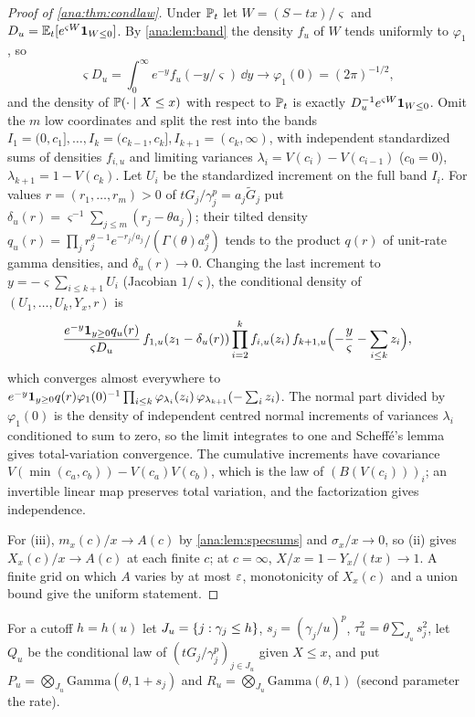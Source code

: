 \begin{proof}[Proof of \cref{ana:thm:condlaw}]
Under $\mathbb{P}_t$ let $W=(S-tx)/\varsigma$ and $D_u=\mathbb{E}_t[e^{\varsigma W}\mathbf{1}_{W\le0}]$. By
\cref{ana:lem:band} the density $f_u$ of $W$ tends uniformly to $\varphi_1$, so
\begin{equation}\label{ana:eq:Du}
 \varsigma D_u=\int_0^\infty e^{-y}f_u(-y/\varsigma)\,\dd y\to\varphi_1(0)=(2\pi)^{-1/2},
\end{equation}
and the density of $\mathbb{P}(\cdot\mid X\le x)$ with respect to $\mathbb{P}_t$ is exactly
$D_u^{-1}e^{\varsigma W}\mathbf{1}_{W\le0}$. Omit the $m$ low coordinates and split the rest into the bands
$I_1=(0,c_1],\dots,I_k=(c_{k-1},c_k],I_{k+1}=(c_k,\infty)$, with independent standardized sums of
densities $f_{i,u}$ and limiting variances $\lambda_i=V(c_i)-V(c_{i-1})$ ($c_0=0$), $\lambda_{k+1}=1-V(c_k)$.
Let $U_i$ be the standardized increment on the full band $I_i$. For values $r=(r_1,\dots,r_m)>0$ of
$tG_j/\gamma_j^p=a_j\widetilde G_j$ put $\delta_u(r)=\varsigma^{-1}\sum_{j\le m}(r_j-\theta a_j)$; their
tilted density $q_u(r)=\prod_j r_j^{\theta-1}e^{-r_j/a_j}/(\Gamma(\theta)a_j^\theta)$ tends to the
product $q(r)$ of unit-rate gamma densities, and $\delta_u(r)\to0$. Changing the last increment to
$y=-\varsigma\sum_{i\le k+1}U_i$ (Jacobian $1/\varsigma$), the conditional density of
$(U_1,\dots,U_k,Y_x,r)$ is
\[
 \frac{e^{-y}\mathbf{1}_{y\ge0}q_u(r)}{\varsigma D_u}\,f_{1,u}(z_1-\delta_u(r))\prod_{i=2}^kf_{i,u}(z_i)\,
 f_{k+1,u}\Bigl(-\frac y\varsigma-\sum_{i\le k}z_i\Bigr),
\]
which converges almost everywhere to
$e^{-y}\mathbf{1}_{y\ge0}q(r)\varphi_1(0)^{-1}\prod_{i\le k}\varphi_{\lambda_i}(z_i)\,
\varphi_{\lambda_{k+1}}(-\sum_iz_i)$. The normal part divided by $\varphi_1(0)$ is the density of
independent centred normal increments of variances $\lambda_i$ conditioned to sum to zero, so the limit
integrates to one and Scheff\'e's lemma gives total-variation convergence. The cumulative increments
have covariance $V(\min(c_a,c_b))-V(c_a)V(c_b)$, which is the law of $(B(V(c_i)))_i$; an invertible
linear map preserves total variation, and the factorization gives independence.

For (iii), $m_x(c)/x\to A(c)$ by \cref{ana:lem:specsums} and $\sigma_x/x\to0$, so (ii) gives
$X_x(c)/x\to A(c)$ at each finite $c$; at $c=\infty$, $X/x=1-Y_x/(tx)\to1$. A finite grid on which $A$
varies by at most $\varepsilon$, monotonicity of $X_x(c)$ and a union bound give the uniform statement.
\end{proof}

For a cutoff $h=h(u)$ let $J_u=\{j:\gamma_j\le h\}$, $s_j=(\gamma_j/u)^p$,
$\tau_u^2=\theta\sum_{J_u}s_j^2$, let $Q_u$ be the conditional law of $(tG_j/\gamma_j^p)_{j\in J_u}$ given
$X\le x$, and put $P_u=\bigotimes_{J_u}\mathrm{Gamma}(\theta,1+s_j)$ and
$R_u=\bigotimes_{J_u}\mathrm{Gamma}(\theta,1)$ (second parameter the rate).

